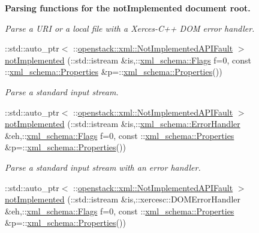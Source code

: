 \begin{Indent}{\bf Parsing functions for the notImplemented document root.}
\begin{DoxyCompactItemize}
\begin{DoxyCompactList}\small\item\em Parse a URI or a local file with a Xerces-\/C++ DOM error handler. \item\end{DoxyCompactList}\item 
::std::auto\_\-ptr$<$ ::\hyperlink{classopenstack_1_1xml_1_1NotImplementedAPIFault}{openstack::xml::NotImplementedAPIFault} $>$ \hyperlink{namespaceopenstack_1_1xml_ad9df39df658bf2e2110aeb06620b34db}{notImplemented} (::std::istream \&is,::\hyperlink{namespacexml__schema_affb4c227cbd9aa7453dd1dc5a1401943}{xml\_\-schema::Flags} f=0, const ::\hyperlink{namespacexml__schema_ad27ce19a7ee1d3b1064092648898f64c}{xml\_\-schema::Properties} \&p=::\hyperlink{namespacexml__schema_ad27ce19a7ee1d3b1064092648898f64c}{xml\_\-schema::Properties}())
\begin{DoxyCompactList}\small\item\em Parse a standard input stream. \item\end{DoxyCompactList}\item 
::std::auto\_\-ptr$<$ ::\hyperlink{classopenstack_1_1xml_1_1NotImplementedAPIFault}{openstack::xml::NotImplementedAPIFault} $>$ \hyperlink{namespaceopenstack_1_1xml_a65c81acdc139f550d4b95dbc15ce24be}{notImplemented} (::std::istream \&is,::\hyperlink{namespacexml__schema_ab1c9361bfd3b404eaabf0c31eded79dc}{xml\_\-schema::ErrorHandler} \&eh,::\hyperlink{namespacexml__schema_affb4c227cbd9aa7453dd1dc5a1401943}{xml\_\-schema::Flags} f=0, const ::\hyperlink{namespacexml__schema_ad27ce19a7ee1d3b1064092648898f64c}{xml\_\-schema::Properties} \&p=::\hyperlink{namespacexml__schema_ad27ce19a7ee1d3b1064092648898f64c}{xml\_\-schema::Properties}())
\begin{DoxyCompactList}\small\item\em Parse a standard input stream with an error handler. \item\end{DoxyCompactList}\item 
::std::auto\_\-ptr$<$ ::\hyperlink{classopenstack_1_1xml_1_1NotImplementedAPIFault}{openstack::xml::NotImplementedAPIFault} $>$ \hyperlink{namespaceopenstack_1_1xml_a27e0446e4f748b40cfbd164948c39a69}{notImplemented} (::std::istream \&is,::xercesc::DOMErrorHandler \&eh,::\hyperlink{namespacexml__schema_affb4c227cbd9aa7453dd1dc5a1401943}{xml\_\-schema::Flags} f=0, const ::\hyperlink{namespacexml__schema_ad27ce19a7ee1d3b1064092648898f64c}{xml\_\-schema::Properties} \&p=::\hyperlink{namespacexml__schema_ad27ce19a7ee1d3b1064092648898f64c}{xml\_\-schema::Properties}())

\end{DoxyCompactItemize}
\end{Indent}
